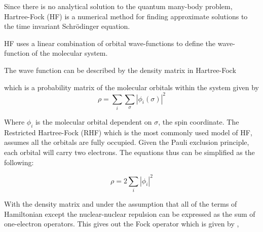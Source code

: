 \documentclass[twoside]{article}
\begin{document}



Since there is no analytical solution to the quantum many-body problem, Hartree-Fock (HF) is a numerical method for finding approximate solutions to the time invariant Schr\"{o}dinger equation. 




HF uses a linear combination of orbital wave-functions to define the wave-function of the molecular system. 

The wave function can be described by the density matrix in Hartree-Fock

which is a probability matrix of the molecular orbitals within the system given by
\[
\rho = \sum_i\sum_\sigma|\phi_i(\sigma)|^2
\]


Where $\phi_i$ is the molecular orbital dependent on $\sigma$, the spin coordinate. The Restricted Hartree-Fock (RHF) which is the most commonly used model of HF, assumes all the orbitals are fully occupied. Given the Pauli exclusion principle, each orbital will carry two electrons. The equations thus can be simplified as the following:

\[
\rho = 2\sum_i|\phi_i|^2
\]


With the density matrix and under the assumption that all of the terms of Hamiltonian except the nuclear-nuclear repulsion can be expressed as the sum of one-electron operators. This gives out the Fock operator which is given by , 

\end{document}

